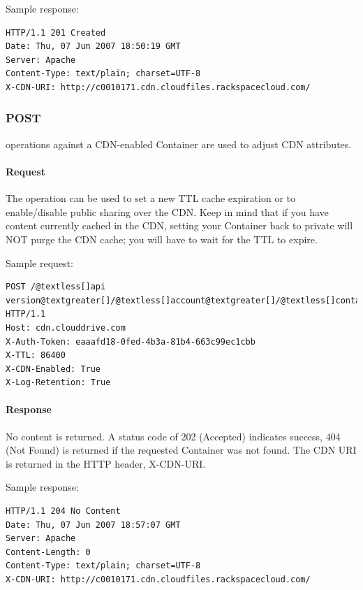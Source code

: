 \documentclass[letterpaper,10pt,english]{manual}
\begin{document}
Sample response:

\begin{Verbatim}[commandchars=@\[\]]
HTTP/1.1 201 Created
Date: Thu, 07 Jun 2007 18:50:19 GMT
Server: Apache
Content-Type: text/plain; charset=UTF-8
X-CDN-URI: http://c0010171.cdn.cloudfiles.rackspacecloud.com/
\end{Verbatim}


\subsubsection{POST}

 operations against a CDN-enabled Container are used to adjust
CDN attributes.


\paragraph{Request}

The  operation can be used to set a new TTL cache expiration or
to enable/disable public sharing over the CDN.  Keep in mind that if
you have content currently cached in the CDN, setting your Container
back to private will NOT purge the CDN cache; you will have to wait for
the TTL to expire.

Sample request:

\begin{Verbatim}[commandchars=@\[\]]
POST /@textless[]api version@textgreater[]/@textless[]account@textgreater[]/@textless[]container@textgreater[] HTTP/1.1
Host: cdn.clouddrive.com
X-Auth-Token: eaaafd18-0fed-4b3a-81b4-663c99ec1cbb
X-TTL: 86400
X-CDN-Enabled: True
X-Log-Retention: True
\end{Verbatim}


\paragraph{Response}

No content is returned. A status code of 202 (Accepted) indicates
success, 404 (Not Found) is returned if the requested Container was
not found.  The CDN URI is returned in the HTTP header, X-CDN-URI.

Sample response:

\begin{Verbatim}[commandchars=@\[\]]
HTTP/1.1 204 No Content
Date: Thu, 07 Jun 2007 18:57:07 GMT
Server: Apache
Content-Length: 0
Content-Type: text/plain; charset=UTF-8
X-CDN-URI: http://c0010171.cdn.cloudfiles.rackspacecloud.com/
\end{Verbatim}
\end{document}
